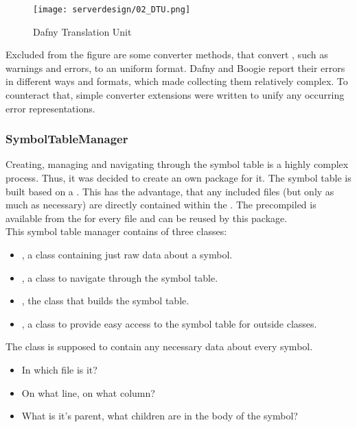 \begin{figure}[H]
    \centering
    \texttt{[image: serverdesign/02\_DTU.png]}
    \caption{Dafny Translation Unit}
    \label{fig:server_dtu}
\end{figure}


Excluded from the figure are some converter methods, that convert , such as warnings and errors, to an uniform format.
Dafny and Boogie report their errors in different ways and formats, which made collecting them relatively complex.
To counteract that, simple converter extensions were written to unify any occurring error representations.\\



\subsubsection{SymbolTableManager}
Creating, managing and navigating through the symbol table is a highly complex process.
Thus, it was decided to create an own package for it.
The symbol table is built based on a .
This has the advantage, that any included files (but only as much as necessary) are directly contained within the .
The precompiled  is available from the  for every file and can be reused by this package.\\

This symbol table manager contains of three classes:
\begin{itemize}
    \item {}, a class containing just raw data about a symbol.
    \item {}, a class to navigate through the symbol table.
    \item {}, the class that builds the symbol table.
    \item {}, a class to provide easy access to the symbol table for outside classes.
\end{itemize}

The class  is supposed to contain any necessary data about every symbol.
\begin{itemize}
    \item In which file is it?
    \item On what line, on what column?
    \item What is it's parent, what children are in the body of the symbol?
\end{itemize}


